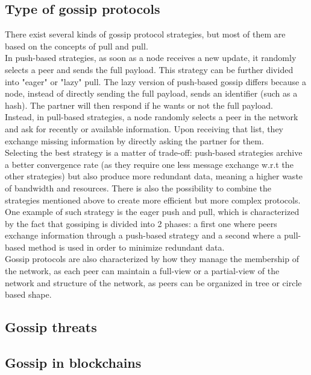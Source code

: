 \documentclass[mscthesis]{usiinfthesis}
\begin{document}
\subsection{Type of gossip protocols}
There exist several kinds of gossip protocol strategies, but most of them are based on the concepts of pull and pull. \\
In push-based strategies, as soon as a node receives a new update, it randomly selects a peer and sends the full payload. This strategy can be further divided into "eager" or "lazy" pull. The lazy version of push-based gossip differs because a node, instead of directly sending the full payload, sends an identifier (such as a hash). The partner will then respond if he wants or not the full payload. \\
Instead, in pull-based strategies, a node randomly selects a peer in the network and ask for recently or available information. Upon receiving that list, they exchange missing information by directly asking the partner for them. \\
Selecting the best strategy is a matter of trade-off: push-based strategies archive a better convergence rate (as they require one less message exchange w.r.t the other strategies) but also produce more redundant data, meaning a higher waste of bandwidth and resources.
There is also the possibility to combine the strategies mentioned above to create more efficient but more complex protocols. \\
One example of such strategy is the eager push and pull, which is characterized by the fact that gossiping is divided into 2 phases: a first one where peers exchange information through a push-based strategy and a second where a pull-based method is used in order to minimize redundant data. \\
Gossip protocols are also characterized by how they manage the membership of the network, as each peer can maintain a full-view or a partial-view of the network and structure of the network, as peers can be organized in tree or circle based shape. %

\subsection{Gossip threats}

\subsection{Gossip in blockchains}
\end{document}
